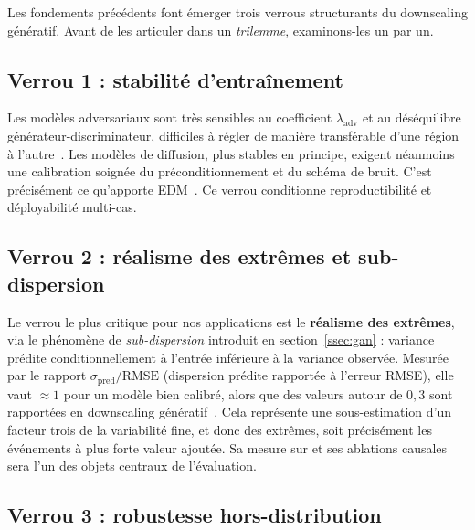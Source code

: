 \label{sec:verrous}

Les fondements précédents font émerger trois verrous structurants du downscaling génératif. Avant de les articuler dans un \emph{trilemme}, examinons-les un par un.

\subsection{Verrou 1 : stabilité d'entraînement}
\label{ssec:verrou-stabilite}

Les modèles adversariaux sont très sensibles au coefficient $\lambda_{\mathrm{adv}}$ et au déséquilibre générateur-discriminateur, difficiles à régler de manière transférable d'une région à l'autre~\cite{rampal_cgan_2024}. Les modèles de diffusion, plus stables en principe, exigent néanmoins une calibration soignée du préconditionnement et du schéma de bruit. C'est précisément ce qu'apporte EDM~\cite{karras_edm_2022}. Ce verrou conditionne reproductibilité et déployabilité multi-cas.

\subsection{Verrou 2 : réalisme des extrêmes et sub-dispersion}
\label{ssec:verrou-extremes}

Le verrou le plus critique pour nos applications est le \textbf{réalisme des extrêmes}, via le phénomène de \emph{sub-dispersion} introduit en section~\ref{ssec:gan} : variance prédite conditionnellement à l'entrée inférieure à la variance observée. Mesurée par le rapport $\sigma_{\mathrm{pred}} / \mathrm{RMSE}$ (dispersion prédite rapportée à l'erreur RMSE), elle vaut $\approx 1$ pour un modèle bien calibré, alors que des valeurs autour de $0{,}3$ sont rapportées en downscaling génératif~\cite{rampal_cgan_2024,mardani_corrdiff_2023,harris_2022}. Cela représente une sous-estimation d'un facteur trois de la variabilité fine, et donc des extrêmes, soit précisément les événements à plus forte valeur ajoutée. Sa mesure sur \Oracle{} et ses ablations causales sera l'un des objets centraux de l'évaluation.

\subsection{Verrou 3 : robustesse hors-distribution}
\label{ssec:verrou-ood}

